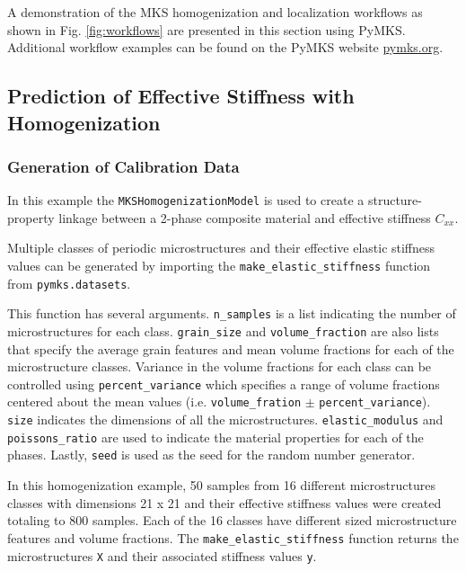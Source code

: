\documentclass{bmcart}
\begin{document}
A demonstration of the MKS homogenization and localization
workflows as shown in Fig. \ref{fig:workflows} 
are presented in this section using PyMKS. Additional workflow examples
can be found on the PyMKS website \url{pymks.org}.

\subsection{Prediction of Effective Stiffness with
Homogenization}\label{prediction-of-effective-stiffness-with-homogenization}

    \subsubsection{Generation of Calibration Data}\label{calibration-data-generation}

In this example the \texttt{MKSHomogenizationModel} is used to create a
structure-property linkage between a 2-phase composite material and
effective stiffness \(C_{xx}\).

Multiple classes of periodic microstructures and their effective elastic
stiffness values can be generated by importing the
\texttt{make\_elastic\_stiffness} function from \texttt{pymks.datasets}.

This function has several arguments. \texttt{n\_samples} is a list
indicating the number of microstructures for each class.
\texttt{grain\_size} and \texttt{volume\_fraction} are also lists that
specify the average grain features and mean volume fractions for each of
the microstructure classes. Variance in the volume fractions for each
class can be controlled using \texttt{percent\_variance} which specifies
a range of volume fractions centered about the mean values (i.e.
\texttt{volume\_fration} \(\pm\) \texttt{percent\_variance}).
\texttt{size} indicates the dimensions of all the microstructures.
\texttt{elastic\_modulus} and \texttt{poissons\_ratio} are used to
indicate the material properties for each of the phases. Lastly,
\texttt{seed} is used as the seed for the random number generator.

In this homogenization example, 50 samples from 16 different
microstructures classes with dimensions 21 x 21 and their effective
stiffness values were created totaling to 800 samples. Each of the 16
classes have different sized microstructure features and volume
fractions. The \texttt{make\_elastic\_stiffness} function returns the
microstructures \texttt{X} and their associated stiffness values
\texttt{y}.
\end{document}
